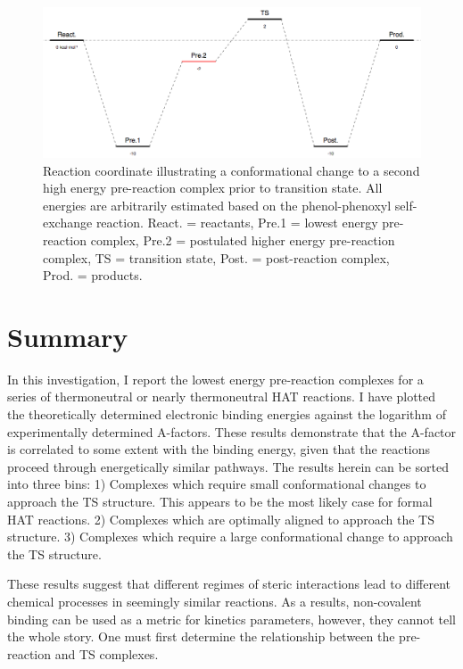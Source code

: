 \begin{figure}[htb]
  \centering
  \includegraphics[width=\textwidth]{figures/afactor-low.png}
  \caption[Reaction coordinate illustrating a conformational change to a second high energy pre-reaction complex prior to transition state.]{Reaction coordinate illustrating a conformational change to a second high energy pre-reaction complex prior to transition state. All energies are arbitrarily estimated based on the phenol-phenoxyl self-exchange reaction. React. = reactants, Pre.1 = lowest energy pre-reaction complex, Pre.2 = postulated higher energy pre-reaction complex, TS = transition state, Post. = post-reaction complex, Prod. = products.}
\label{fig:afactor-low}
\end{figure}

\section{Summary}

In this investigation, I report the lowest energy pre-reaction complexes for a series of thermoneutral or nearly thermoneutral HAT reactions. I have plotted the theoretically determined electronic binding energies against the logarithm of experimentally determined A-factors. These results demonstrate that the A-factor is correlated to some extent with the binding energy, given that the reactions proceed through energetically similar pathways. The results herein can be sorted into three bins: 1) Complexes which require small conformational changes to approach the TS structure. This appears to be the most likely case for formal HAT reactions. 2) Complexes which are optimally aligned to approach the TS structure. 3) Complexes which require a large conformational change to approach the TS structure.

These results suggest that different regimes of steric interactions lead to different chemical processes in seemingly similar reactions. As a results, non-covalent binding can be used as a metric for kinetics parameters, however, they cannot tell the whole story. One must first determine the relationship between the pre-reaction and TS complexes.

